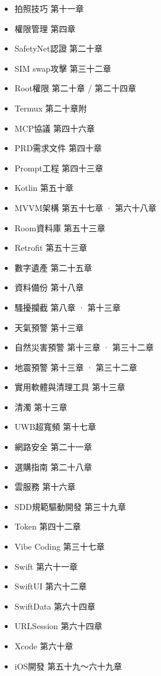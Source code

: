 
\begin{itemize}
  \item 拍照技巧 第十一章
  \item 權限管理 第四章
  \item SafetyNet認證 第二十章
  \item SIM swap攻擊 第三十二章
  \item Root權限 第二十章 / 第二十四章
  \item Termux 第二十章附
  \item MCP協議 第四十六章
  \item PRD需求文件 第四十章
  \item Prompt工程 第四十三章
  \item Kotlin 第五十章
  \item MVVM架構 第五十七章 · 第六十八章
  \item Room資料庫 第五十三章
  \item Retrofit 第五十三章
\end{itemize}


\begin{itemize}
  \item 數字遺產 第二十五章
  \item 資料備份 第十八章
  \item 騷擾攔截 第八章 · 第十三章
  \item 天氣預警 第十三章
  \item 自然災害預警 第十三章 · 第三十二章
  \item 地震預警 第十三章 · 第三十二章
  \item 實用軟體與清理工具 第十三章
  \item 清濁 第十三章
  \item UWB超寬頻 第十七章
  \item 網路安全 第二十一章
  \item 選購指南 第二十八章
  \item 雲服務 第十六章
  \item SDD規範驅動開發 第三十九章
  \item Token 第四十二章
  \item Vibe Coding 第三十七章
  \item Swift 第六十一章
  \item SwiftUI 第六十二章
  \item SwiftData 第六十四章
  \item URLSession 第六十四章
  \item Xcode 第六十章
  \item iOS開發 第五十九～六十九章
\end{itemize}

